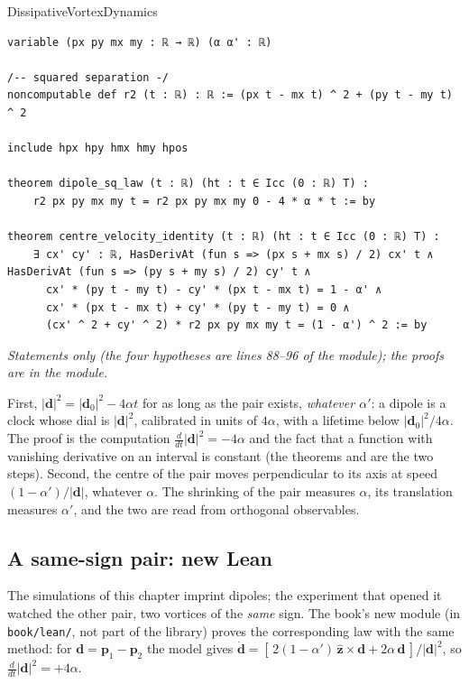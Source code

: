 \begin{leanbox}[unbreakable]{DissipativeVortexDynamics}
\begin{lstlisting}[style=lean,basicstyle=\ttfamily\footnotesize]
variable (px py mx my : ℝ → ℝ) (α α' : ℝ)

/-- squared separation -/
noncomputable def r2 (t : ℝ) : ℝ := (px t - mx t) ^ 2 + (py t - my t) ^ 2

include hpx hpy hmx hmy hpos

theorem dipole_sq_law (t : ℝ) (ht : t ∈ Icc (0 : ℝ) T) :
    r2 px py mx my t = r2 px py mx my 0 - 4 * α * t := by

theorem centre_velocity_identity (t : ℝ) (ht : t ∈ Icc (0 : ℝ) T) :
    ∃ cx' cy' : ℝ, HasDerivAt (fun s => (px s + mx s) / 2) cx' t ∧ HasDerivAt (fun s => (py s + my s) / 2) cy' t ∧
      cx' * (py t - my t) - cy' * (px t - mx t) = 1 - α' ∧
      cx' * (px t - mx t) + cy' * (py t - my t) = 0 ∧
      (cx' ^ 2 + cy' ^ 2) * r2 px py mx my t = (1 - α') ^ 2 := by
\end{lstlisting}
\nopagebreak[4]\smallskip\noindent\textit{Statements only (the four hypotheses are lines 88--96 of the module); the proofs are in the module.}
\end{leanbox}

First, $|\mathbf d|^2=|\mathbf d_0|^2-4\alpha t$ for as long as the pair exists, \emph{whatever $\alpha'$}: a dipole is a clock whose dial is $|\mathbf d|^2$, calibrated in units of $4\alpha$, with a lifetime below
$|\mathbf d_0|^2/4\alpha$. The proof is the computation $\frac{d}{dt}|\mathbf d|^2=-4\alpha$ and the fact that a function with vanishing derivative on an interval is constant (the theorems
 and  are the two steps). Second, the centre of the pair moves perpendicular to its axis at speed $(1-\alpha')/|\mathbf d|$, whatever $\alpha$. The shrinking of the pair measures $\alpha$, its
translation measures $\alpha'$, and the two are read from orthogonal observables.

\subsection*{A same-sign pair: new Lean}

The simulations of this chapter imprint dipoles; the experiment that opened it watched the other pair, two vortices of the \emph{same} sign. The book's new module 
(in \texttt{book/lean/}, not part of the library) proves the corresponding law with the same method: for $\mathbf d=\mathbf p_1-\mathbf p_2$ the model gives
$\dot{\mathbf d}=[\,2(1-\alpha')\,\hat{\mathbf z}\times\mathbf d+2\alpha\,\mathbf d\,]/|\mathbf d|^2$, so $\frac{d}{dt}|\mathbf d|^2=+4\alpha$.

